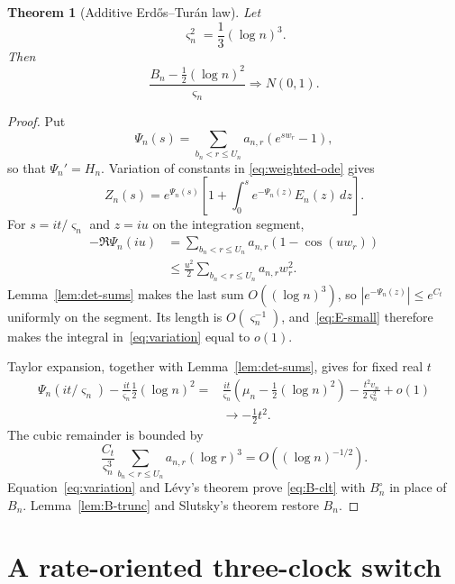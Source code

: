 \documentclass[11pt]{article}
\newtheorem{theorem}{Theorem}[section]
\theoremstyle{remark}
\newcommand{\dd}{\,d}
\begin{document}
\begin{theorem}[Additive Erd\H{o}s--Tur\'an law]\label{thm:B-clt}
Let
\[
 \varsigma_n^2=\frac13(\log n)^3.
\]
Then
\begin{equation}\label{eq:B-clt}
 \frac{B_n-\frac12(\log n)^2}{\varsigma_n}
 \Rightarrow N(0,1).
\end{equation}
\end{theorem}

\begin{proof}
Put
\[
 \Psi_n(s)=\sum_{b_n<r\leq U_n}a_{n,r}(e^{sw_r}-1),
\]
so that $\Psi_n'=H_n$.  Variation of constants in
\eqref{eq:weighted-ode} gives
\begin{equation}\label{eq:variation}
 Z_n(s)=e^{\Psi_n(s)}
 \left[1+\int_0^s e^{-\Psi_n(z)}E_n(z)\dd z\right].
\end{equation}
For $s=it/\varsigma_n$ and $z=iu$ on the integration segment,
\begin{align*}
 -\Re\Psi_n(iu)
 &=\sum_{b_n<r\leq U_n}a_{n,r}(1-\cos(uw_r))\\
 &\leq\frac{u^2}{2}
 \sum_{b_n<r\leq U_n}a_{n,r}w_r^2.
\end{align*}
Lemma~\ref{lem:det-sums} makes the last sum $O((\log n)^3)$, so
$|e^{-\Psi_n(z)}|\leq e^{C_t}$ uniformly on the segment.  Its length is
$O(\varsigma_n^{-1})$, and~\eqref{eq:E-small} therefore makes the integral
in~\eqref{eq:variation} equal to $o(1)$.

Taylor expansion, together with Lemma~\ref{lem:det-sums}, gives for fixed
real $t$
\begin{align*}
 \Psi_n(it/\varsigma_n)
 -\frac{it}{\varsigma_n}\frac12(\log n)^2
 ={}&\frac{it}{\varsigma_n}
 \left(\mu_n-\frac12(\log n)^2\right)
 -\frac{t^2v_n}{2\varsigma_n^2}+o(1)\\
 &\longrightarrow-\frac12t^2.
\end{align*}
The cubic remainder is bounded by
\[
 \frac{C_t}{\varsigma_n^3}
 \sum_{b_n<r\leq U_n}a_{n,r}(\log r)^3
 =O((\log n)^{-1/2}).
\]
Equation~\eqref{eq:variation} and L\'evy's theorem prove
\eqref{eq:B-clt} with $B_n^\circ$ in place of $B_n$.
Lemma~\ref{lem:B-trunc} and Slutsky's theorem restore $B_n$.
\end{proof}

\section{A rate-oriented three-clock switch}
\end{document}
